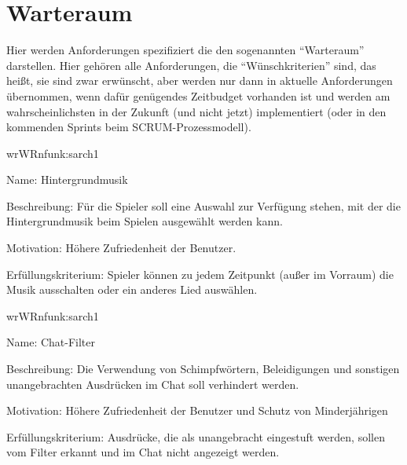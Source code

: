 \chapter{Warteraum}

Hier werden Anforderungen spezifiziert die den sogenannten ``Warteraum'' darstellen. Hier gehören alle Anforderungen, die ``Wünschkriterien'' sind, das heißt, sie sind zwar erwünscht, aber werden nur dann in aktuelle Anforderungen übernommen, wenn dafür genügendes Zeitbudget vorhanden ist und werden am wahrscheinlichsten in der Zukunft (und nicht jetzt) implementiert (oder in den kommenden Sprints beim SCRUM-Prozessmodell).

\setcounter{wr}{10}

\begin{description}[leftmargin=5em, style=sameline]	
	\begin{lhp}{wr}{WR}{nfunk:sarch1}
		\item [Name:] Hintergrundmusik
		\item [Beschreibung:] Für die Spieler soll eine Auswahl zur Verfügung stehen, mit der die Hintergrundmusik beim Spielen ausgewählt werden kann.
		\item [Motivation:] Höhere Zufriedenheit der Benutzer.
		\item [Erfüllungskriterium:] Spieler können zu jedem Zeitpunkt (außer im Vorraum) die Musik ausschalten oder ein anderes Lied auswählen.
	\end{lhp}
	
	\begin{lhp}{wr}{WR}{nfunk:sarch1}
		\item [Name:] Chat-Filter
		\item [Beschreibung:] Die Verwendung von Schimpfwörtern, Beleidigungen und sonstigen unangebrachten Ausdrücken im Chat soll verhindert werden.
		\item [Motivation:] Höhere Zufriedenheit der Benutzer und Schutz von Minderjährigen
		\item [Erfüllungskriterium:] Ausdrücke, die als unangebracht eingestuft werden, sollen vom Filter erkannt und im Chat nicht angezeigt werden.
	\end{lhp}
\end{description}